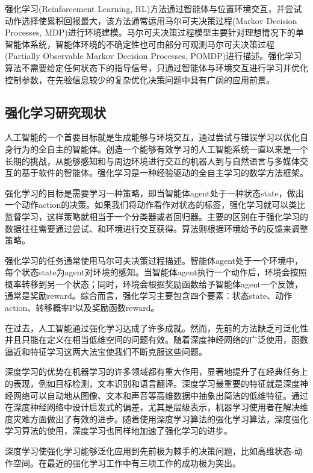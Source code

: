 强化学习(Reinforcement Learning, RL)方法通过智能体与位置环境交互，并尝试动作选择使累积回报最大，该方法通常运用马尔可夫决策过程(Markov Decision Processes, MDP)进行环境建模。马尔可夫决策过程模型主要针对理想情况下的单智能体系统，智能体环境的不确定性也可由部分可观测马尔可夫决策过程(Partially Observable Markov Decision Processes, POMDP)进行描述。强化学习算法不需要给定任何状态下的指导信号，只通过智能体与环境交互进行学习并优化控制参数，在先验信息较少的复杂优化决策问题中具有广阔的应用前景。

\subsection{强化学习研究现状}
人工智能的一个首要目标就是生成能够与环境交互，通过尝试与错误学习以优化自身行为的全自主的智能体。创造一个能够有效学习的人工智能系统一直以来是一个长期的挑战，从能够感知和与周边环境进行交互的机器人到与自然语言与多媒体交互的基于软件的智能体。强化学习是一种经验驱动的全自主学习的数学方法框架\cite{8}。

强化学习的目标是需要学习一种策略，即当智能体agent处于一种状态state，做出一个动作action的决策。如果我们将动作看作对状态的标签，强化学习就可以类比监督学习，这样策略就相当于一个分类器或者回归器。主要的区别在于强化学习的数据往往需要通过尝试、和环境进行交互获得。算法则根据环境给予的反馈来调整策略。

强化学习的任务通常使用马尔可夫决策过程描述。智能体agent处于一个环境中，每个状态state为agent对环境的感知。当智能体agent执行一个动作后，环境会按照概率转移到另一个状态；同时，环境会根据奖励函数给予智能体agent一个反馈，通常是奖励reward。综合而言，强化学习主要包含四个要素：状态state、动作action、转移概率P以及奖励函数reward。

在过去，人工智能通过强化学习达成了许多成就。然而，先前的方法缺乏可泛化性并且只能在定义在相当低维空间的问题有效。随着深度神经网络的广泛使用，函数逼近和特征学习这两大法宝使我们不断克服这些问题。

深度学习的优势在机器学习的许多领域都有重大作用，显著地提升了在经典任务上的表现，例如目标检测，文本识别和语言翻译\cite{9}。深度学习最重要的特征就是深度神经网络可以自动地从图像、文本和声音等高维数据中抽象出简洁的低维特征。通过在深度神经网络中设计启发式的偏差，尤其是层级表示，机器学习使用者在解决维度灾难方面做出了有效的进步\cite{10}。随着使用深度学习算法的强化学习算法，深度强化学习算法的使用，深度学习也同样地加速了强化学习的进步。

深度学习使强化学习能够泛化应用到先前极为棘手的决策问题，比如高维状态-动作空间。在最近的强化学习工作中有三项工作的成功极为突出。


